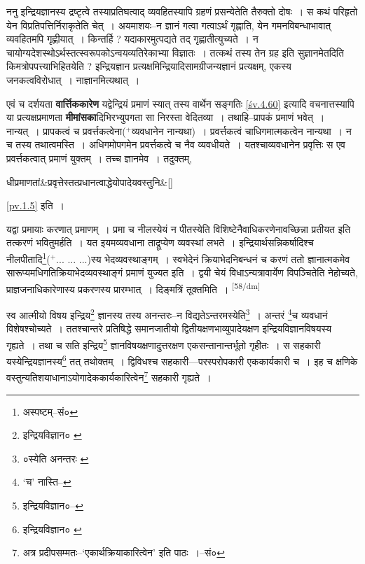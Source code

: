 \documentclass[article,12pt,a4paper]{memoir}
\newcommand{\add}[1]{($^{+}$#1)}
\begin{document}
	  \pstart ननु इन्द्रियज्ञानस्य द्रष्टृत्वे तस्याप्रतिघत्वाद् व्यवहितस्यापि ग्रहणं प्रसन्येतेति तैरुक्तो दोषः । स कथं परिहृतो येन विप्रतिपत्तिर्निराकृतेति चेत् । अयमाशयः--न ज्ञानं गत्वा गत्वाऽर्थं गृह्णाति, येन गमनविबन्धाभावात् व्यवहितमपि गृह्णीयात् । किन्तर्हि ? यदाकारमुत्पद्यते तद् गृह्णातीत्युच्यते । न चायोग्यदेशस्थोऽर्थस्तत्स्वरूपकोऽन्वयव्यतिरेकाभ्या विज्ञातः । तत्कथं तस्य तेन ग्रह इति सुज्ञानमेतदिति किमत्रोपपत्त्याभिहितयेति ? इन्द्रियज्ञान प्रत्यक्षमिन्द्रियादिसामग्रीजन्यज्ञानं प्रत्यक्षम्, एकस्य जनकत्वविरोधात् । नाज्ञानमित्यथात् ।
	\pend
      

	  \pstart एवं च दर्शयता \textbf{वार्त्तिककारेण} यद्वेन्द्रियं प्रमाणं स्यात् तस्य वार्थेन सङ्गतिः \cref{śv.4.60} इत्यादि वचनात्तस्यापि या प्रत्यक्षप्रमाणता \textbf{मीमांसका}दिभिरभ्युपगता सा निरस्ता वेदितव्या । तथाहि--प्रापकं प्रमाणं भवेत् । नान्यत् । प्रापकत्वं च प्रवर्त्तकत्वेना\add{व्यवधानेन नान्यथा} । प्रवर्त्तकत्वं चाधिगमात्मकत्वेन नान्यथा । न च तस्य तथात्वमस्ति । अधिगमोपगमेन प्रवर्त्तकत्वे च नैव व्यवधीयते । यतश्चाव्यवधानेन प्रवृत्तिः स एव प्रवर्त्तकत्वात् प्रमाणं युक्तम् । तच्च ज्ञानमेव । तदुक्तम्, 
	    \pend
	  
	    
	    \stanza[\smallbreak]
धीप्रमाणतां&प्रवृत्तेस्तत्प्रधानत्वाद्धेयोपादेयवस्तुनि\&[\smallbreak]


	
	    \pstart
	   \cref{pv.1.5} इति ।
	\pend
      

	  \pstart यद्वा प्रमायाः करणात् प्रमाणम् । प्रमा च नीलस्येयं न पीतस्येति विशिष्टेनैवाधिकरणेनावच्छिन्ना प्रतीयत इति तत्करणं भवितुमर्हति । यत इयमव्यवधाना ताद्रूप्येण व्यवस्थां लभते । इन्द्रियार्थसन्निकर्षादिश्च नीलपीतादि\footnote{अस्पष्टम्--सं०}\add{... ... ...}स्य भेदव्यवस्थाङ्गम् । स्वभेदेनं क्रियाभेदनिबन्धनं च करणं ततो ज्ञानात्मकमेव सारूप्यमधिगतिक्रियाभेदव्यवस्थाङ्गं प्रमाणं युज्यत इति । द्वयी चेयं विधाऽन्यत्रावार्येण विपञ्चितेति नेहोच्यते, प्राज्ञजनाधिकारेणास्य प्रकरणस्य प्रारम्भात् । दिङ्मत्रिं तूक्तमिति ।
	\pend
      \leavevmode\textsuperscript{\rmlatinfont\tiny [58/dm]}

	  \pstart स्व आत्मीयो विषय इन्द्रिय\footnote{इन्द्रियविज्ञान० \cite{dp-msB}} ज्ञानस्य तस्य अनन्तरः--न विद्यतेऽन्तरमस्येति\footnote{०स्येति अनन्तरः \cite{dp-msB} \cite{dp-msD}} । अन्तरं \footnote{‘च’ नास्ति--\cite{dp-msC}}च व्यवधानं विशेषश्चोच्यते । ततश्चान्तरे प्रतिषिद्धे समानजातीयो द्वितीयक्षणभाव्युपादेयक्षण इन्द्रियविज्ञानविषयस्य गृह्यते । तथा च सति इन्द्रिय\footnote{इन्द्रियविज्ञान०--\cite{dp-msC}} ज्ञानविषयक्षणादुत्तरक्षण एकसन्तानान्तर्भूतो गृहीतः । स सहकारी यस्येन्द्रियज्ञानस्य\footnote{इन्द्रियविज्ञान० \cite{dp-msA} \cite{dp-msB} \cite{dp-msD} \cite{dp-edP} \cite{dp-edH} \cite{dp-edE} \cite{dp-edN}} तत् तथोक्तम् । द्विविधश्च सहकारी—परस्परोपकारी एककार्यकारी च । इह च क्षणिके वस्तुन्यतिशयाधानाऽयोगादेककार्यकारित्वेन\footnote{अत्र प्रदीपसम्मतः--‘एकार्थक्रियाकारित्वेन’ इति पाठः ।--सं०} सहकारी गृह्यते ।
	\pend
      
\end{document}

